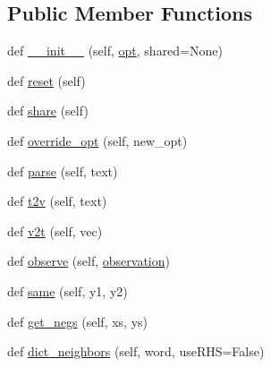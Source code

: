 \subsection*{Public Member Functions}
\begin{DoxyCompactItemize}
\item 
def \hyperlink{classparlai_1_1agents_1_1starspace_1_1starspace_1_1StarspaceAgent_a6bdc1142c021946ee6cb409d4f9dc3c9}{\+\_\+\+\_\+init\+\_\+\+\_\+} (self, \hyperlink{classparlai_1_1agents_1_1starspace_1_1starspace_1_1StarspaceAgent_aae476e9cdd8b9672ae6c28ef9400f09e}{opt}, shared=None)
\item 
def \hyperlink{classparlai_1_1agents_1_1starspace_1_1starspace_1_1StarspaceAgent_a4d5057250faeae3f3812603469daa282}{reset} (self)
\item 
def \hyperlink{classparlai_1_1agents_1_1starspace_1_1starspace_1_1StarspaceAgent_a4a03374eadb6aa60dcd01173f0f5aa6b}{share} (self)
\item 
def \hyperlink{classparlai_1_1agents_1_1starspace_1_1starspace_1_1StarspaceAgent_ab75a17fe54cbc5ba074ca2df457235d4}{override\+\_\+opt} (self, new\+\_\+opt)
\item 
def \hyperlink{classparlai_1_1agents_1_1starspace_1_1starspace_1_1StarspaceAgent_ab08bd065e56f11ebe2ad30d3894c46c7}{parse} (self, text)
\item 
def \hyperlink{classparlai_1_1agents_1_1starspace_1_1starspace_1_1StarspaceAgent_ad38444615578df64d2e341b2ce37a012}{t2v} (self, text)
\item 
def \hyperlink{classparlai_1_1agents_1_1starspace_1_1starspace_1_1StarspaceAgent_a070074c4396b7ea6edc56e190e0c011f}{v2t} (self, vec)
\item 
def \hyperlink{classparlai_1_1agents_1_1starspace_1_1starspace_1_1StarspaceAgent_a788b504ead65ec6af074717226cc07bb}{observe} (self, \hyperlink{classparlai_1_1agents_1_1starspace_1_1starspace_1_1StarspaceAgent_a0ec7b24305a7ca5f0fd5a11cd6aa1fdc}{observation})
\item 
def \hyperlink{classparlai_1_1agents_1_1starspace_1_1starspace_1_1StarspaceAgent_a763de34b8d6464cbaa1ba17bf83f7df0}{same} (self, y1, y2)
\item 
def \hyperlink{classparlai_1_1agents_1_1starspace_1_1starspace_1_1StarspaceAgent_a9591d5f485debcf4611e24be38900b5e}{get\+\_\+negs} (self, xs, ys)
\item 
def \hyperlink{classparlai_1_1agents_1_1starspace_1_1starspace_1_1StarspaceAgent_abf3eb0a95a46ba21d819ef09465390c3}{dict\+\_\+neighbors} (self, word, use\+R\+HS=False)
\item 

\end{DoxyCompactItemize}
